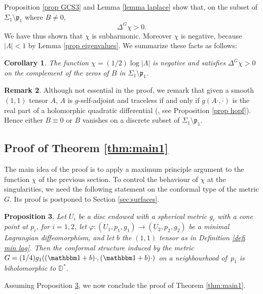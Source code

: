 \documentclass[JEP,XML,SOM,Unicode,NoEqCountersInSection,published]{cedram}
\newtheorem{cor}{Corollary}[section]
\newtheorem{prop}[cor]{Proposition}
\theoremstyle{definition}
\newtheorem{remark}[cor]{Remark}
\begin{document}
Proposition \ref{prop GCS3} and Lemma \ref{lemma laplace} show that, on the subset of $\Sigma_1\setminus\mathfrak p_1$ where $B\neq 0$,
\[
\Delta^G\chi> 0.
\]
We have thus shown that $\chi$ is subharmonic. Moreover $\chi$ is negative, because $|\Lambda|<1$ by Lemma \ref{prop eigenvalues}. We summarize these facts as follows:

\begin{cor}\label{cor subharmonic}
The function $\chi=(1/2)\log|\Lambda|$ is negative and satisfies $\Delta^G\chi>0$ on the complement of the zeros of $B$ in $\Sigma_1\setminus\mathfrak p_1$.
\end{cor}

\begin{remark}
Although not essential in the proof, we remark that given a smooth $(1,1)$ tensor $A$, $A$ is $g$-self-adjoint and traceless if and only if $g(A\cdot,\cdot)$ is the real part of a holomorphic quadratic differential (\cite{zbMATH03064601}, see Proposition \ref{prop hopf}). Hence either $B\equiv 0$ or $B$ vanishes on a discrete subset of $\Sigma_1\setminus\mathfrak p_1$.
\end{remark}

\subsection{Proof of Theorem \ref{thm:main1}}

The main idea of the proof is to apply a maximum principle argument to the function $\chi$ of the previous section. To control the behaviour of $\chi$ at the singularities, we need the following statement on the conformal type of the metric $G$. Its proof is postponed to Section \ref{sec:surfaces}.

\begin{prop}\label{prop:conf type}\label{lemma realize min lag}
Let $U_i$ be a disc endowed with a spherical metric $g_i$ with a cone point at $p_i$, for $i=1,2$, let $\varphi:(U_1,p_1,g_1)\to (U_2,p_2,g_2)$ be a minimal Lagrangian diffeomorphism, and let $b$ the $(1,1)$ tensor as in Definition \ref{defi min lag}.
Then the conformal structure induced by the metric $G=(1/4)g_1((\mathbbm 1+b)\cdot,(\mathbbm 1+b)\cdot)$ on a neighbourhood of~$p_1$ is biholomorphic to $\mathbb D^*$.
\end{prop}

Assuming Proposition \ref{prop:conf type}, we now conclude the proof of Theorem \ref{thm:main1}.
\end{document}
